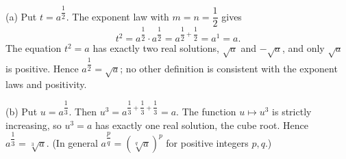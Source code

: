 (a) Put $t=a^{\dfrac{1}{2}}$. The exponent law with $m=n=\dfrac{1}{2}$ gives
\[
t^2=a^{\dfrac{1}{2}}\cdot a^{\dfrac{1}{2}}=a^{\dfrac{1}{2}+\dfrac{1}{2}}=a^1=a .
\]
The equation $t^2=a$ has exactly two real solutions, $\sqrt a$ and $-\sqrt a$, and only $\sqrt a$ is positive. Hence $a^{\dfrac{1}{2}}=\sqrt a$; no other definition is consistent with the exponent laws and positivity.

(b) Put $u=a^{\dfrac{1}{3}}$. Then $u^3=a^{\dfrac{1}{3}+\dfrac{1}{3}+\dfrac{1}{3}}=a$. The function $u\mapsto u^3$ is strictly increasing, so $u^3=a$ has exactly one real solution, the cube root. Hence $a^{\dfrac{1}{3}}=\boxed{\sqrt[3]{a}}$. (In general $a^{\dfrac {p}{q}}=\left(\sqrt[q]{a}\right)^p$ for positive integers $p,q$.)

